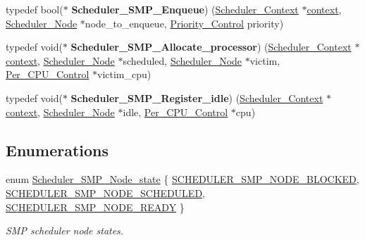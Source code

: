 \begin{DoxyCompactItemize}
\item 
\mbox{\label{group__RTEMSScoreSchedulerSMP_ga4576676f823a9941b80cacbb8054e544}} 
typedef bool($\ast$ {\bfseries Scheduler\+\_\+\+S\+M\+P\+\_\+\+Enqueue}) (\mbox{\hyperlink{structScheduler__Context}{Scheduler\+\_\+\+Context}} $\ast$\mbox{\hyperlink{sun4u_2tte_8h_a9b4a99475e2709333b8e5d70483173f1}{context}}, \mbox{\hyperlink{structScheduler__Node}{Scheduler\+\_\+\+Node}} $\ast$node\+\_\+to\+\_\+enqueue, \mbox{\hyperlink{group__RTEMSScorePriority_ga59d02b58072d31a9a1cfe644557aefe2}{Priority\+\_\+\+Control}} priority)
\item 
\mbox{\label{group__RTEMSScoreSchedulerSMP_gabe9f032d525c50fe161f23889e2ecd78}} 
typedef void($\ast$ {\bfseries Scheduler\+\_\+\+S\+M\+P\+\_\+\+Allocate\+\_\+processor}) (\mbox{\hyperlink{structScheduler__Context}{Scheduler\+\_\+\+Context}} $\ast$\mbox{\hyperlink{sun4u_2tte_8h_a9b4a99475e2709333b8e5d70483173f1}{context}}, \mbox{\hyperlink{structScheduler__Node}{Scheduler\+\_\+\+Node}} $\ast$scheduled, \mbox{\hyperlink{structScheduler__Node}{Scheduler\+\_\+\+Node}} $\ast$victim, \mbox{\hyperlink{structPer__CPU__Control}{Per\+\_\+\+C\+P\+U\+\_\+\+Control}} $\ast$victim\+\_\+cpu)
\item 
\mbox{\label{group__RTEMSScoreSchedulerSMP_gaf5b6c3f0f71ff2dc7f9939bfc61e787d}} 
typedef void($\ast$ {\bfseries Scheduler\+\_\+\+S\+M\+P\+\_\+\+Register\+\_\+idle}) (\mbox{\hyperlink{structScheduler__Context}{Scheduler\+\_\+\+Context}} $\ast$\mbox{\hyperlink{sun4u_2tte_8h_a9b4a99475e2709333b8e5d70483173f1}{context}}, \mbox{\hyperlink{structScheduler__Node}{Scheduler\+\_\+\+Node}} $\ast$idle, \mbox{\hyperlink{structPer__CPU__Control}{Per\+\_\+\+C\+P\+U\+\_\+\+Control}} $\ast$cpu)
\end{DoxyCompactItemize}
\subsection*{Enumerations}
\begin{DoxyCompactItemize}
\item 
enum \mbox{\hyperlink{group__RTEMSScoreSchedulerSMP_gae8abff79029e8e3da109701348c4eccd}{Scheduler\+\_\+\+S\+M\+P\+\_\+\+Node\+\_\+state}} \{ \mbox{\hyperlink{group__RTEMSScoreSchedulerSMP_ggae8abff79029e8e3da109701348c4eccdabba8661884021992acaac8ac523c7069}{S\+C\+H\+E\+D\+U\+L\+E\+R\+\_\+\+S\+M\+P\+\_\+\+N\+O\+D\+E\+\_\+\+B\+L\+O\+C\+K\+ED}}, 
\mbox{\hyperlink{group__RTEMSScoreSchedulerSMP_ggae8abff79029e8e3da109701348c4eccdac4d10bb2c8414a73604c79e008b18333}{S\+C\+H\+E\+D\+U\+L\+E\+R\+\_\+\+S\+M\+P\+\_\+\+N\+O\+D\+E\+\_\+\+S\+C\+H\+E\+D\+U\+L\+ED}}, 
\mbox{\hyperlink{group__RTEMSScoreSchedulerSMP_ggae8abff79029e8e3da109701348c4eccda68a173288a0e73643766bc38d4f2484b}{S\+C\+H\+E\+D\+U\+L\+E\+R\+\_\+\+S\+M\+P\+\_\+\+N\+O\+D\+E\+\_\+\+R\+E\+A\+DY}}
 \}
\begin{DoxyCompactList}\small\item\em S\+MP scheduler node states. \end{DoxyCompactList}\end{DoxyCompactItemize}
